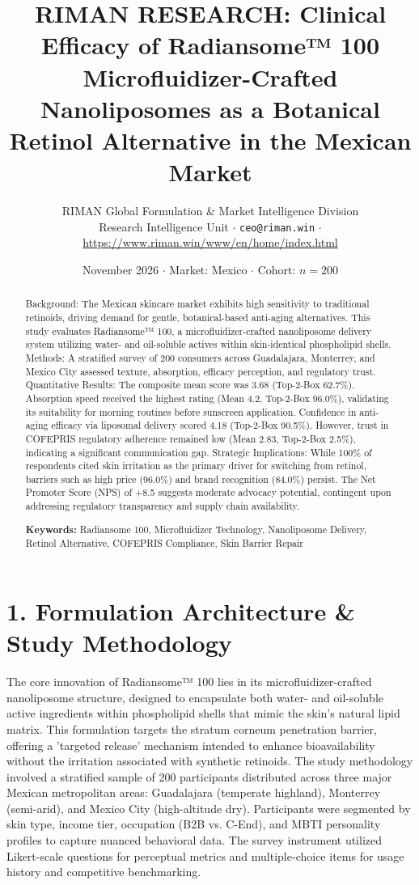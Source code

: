 \documentclass[10pt,twocolumn,a4paper]{article}
\title{\textbf{RIMAN RESEARCH: Clinical Efficacy of Radiansome™ 100 Microfluidizer-Crafted Nanoliposomes as a Botanical Retinol Alternative in the Mexican Market}}
\author{RIMAN Global Formulation \& Market Intelligence Division\\
\small Research Intelligence Unit $\cdot$ \texttt{ceo@riman.win} $\cdot$ \url{https://www.riman.win/www/en/home/index.html}}
\date{November 2026 \quad $\cdot$ \quad Market: Mexico \quad $\cdot$ \quad Cohort: $n = 200$}
\begin{document}
\maketitle

\begin{abstract}
Background: The Mexican skincare market exhibits high sensitivity to traditional retinoids, driving demand for gentle, botanical-based anti-aging alternatives. This study evaluates Radiansome™ 100, a microfluidizer-crafted nanoliposome delivery system utilizing water- and oil-soluble actives within skin-identical phospholipid shells. Methods: A stratified survey of 200 consumers across Guadalajara, Monterrey, and Mexico City assessed texture, absorption, efficacy perception, and regulatory trust. Quantitative Results: The composite mean score was 3.68 (Top-2-Box 62.7\%). Absorption speed received the highest rating (Mean 4.2, Top-2-Box 96.0\%), validating its suitability for morning routines before sunscreen application. Confidence in anti-aging efficacy via liposomal delivery scored 4.18 (Top-2-Box 90.5\%). However, trust in COFEPRIS regulatory adherence remained low (Mean 2.83, Top-2-Box 2.5\%), indicating a significant communication gap. Strategic Implications: While 100\% of respondents cited skin irritation as the primary driver for switching from retinol, barriers such as high price (96.0\%) and brand recognition (84.0\%) persist. The Net Promoter Score (NPS) of +8.5 suggests moderate advocacy potential, contingent upon addressing regulatory transparency and supply chain availability.

\vspace{0.4em}
\noindent\textbf{Keywords:} Radiansome 100, Microfluidizer Technology, Nanoliposome Delivery, Retinol Alternative, COFEPRIS Compliance, Skin Barrier Repair
\end{abstract}

\section{1. Formulation Architecture \& Study Methodology}
The core innovation of Radiansome™ 100 lies in its microfluidizer-crafted nanoliposome structure, designed to encapsulate both water- and oil-soluble active ingredients within phospholipid shells that mimic the skin’s natural lipid matrix. This formulation targets the stratum corneum penetration barrier, offering a 'targeted release' mechanism intended to enhance bioavailability without the irritation associated with synthetic retinoids. The study methodology involved a stratified sample of 200 participants distributed across three major Mexican metropolitan areas: Guadalajara (temperate highland), Monterrey (semi-arid), and Mexico City (high-altitude dry). Participants were segmented by skin type, income tier, occupation (B2B vs. C-End), and MBTI personality profiles to capture nuanced behavioral data. The survey instrument utilized Likert-scale questions for perceptual metrics and multiple-choice items for usage history and competitive benchmarking.
\end{document}
